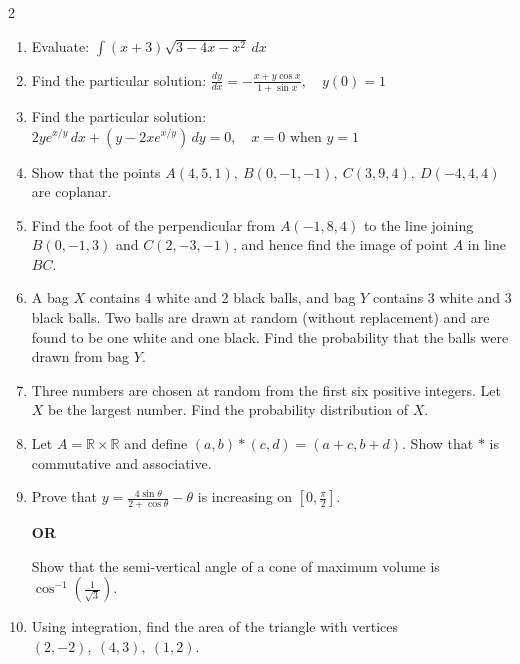 \documentclass[12pt,a4paper]{article}
\begin{document}
\begin{multicols}{2}\sloppy
\begin{enumerate}[label=\textbf{\arabic*.}, leftmargin=*, start=14]

\item Evaluate:  
$\displaystyle \int (x+3)\sqrt{3-4x-x^2}\,dx$

\item Find the particular solution:  
$\displaystyle \frac{dy}{dx}=-\frac{x+y\cos x}{1+\sin x}, \quad y(0)=1$

\item Find the particular solution:  
$\displaystyle 2y e^{x/y}\,dx+(y-2x e^{x/y})\,dy=0,\quad x=0 \text{ when } y=1$

\item Show that the points  
$A(4,5,1),\ B(0,-1,-1),\ C(3,9,4),\ D(-4,4,4)$  
are coplanar.

\item Find the foot of the perpendicular from  
$A(-1,8,4)$  
to the line joining  
$B(0,-1,3)$ and $C(2,-3,-1)$,  
and hence find the image of point $A$ in line $BC$.

\item A bag $X$ contains 4 white and 2 black balls, and bag $Y$ contains 3 white and 3 black balls.  
Two balls are drawn at random (without replacement) and are found to be one white and one black.  
Find the probability that the balls were drawn from bag $Y$.

\item Three numbers are chosen at random from the first six positive integers.  
Let $X$ be the largest number.  
Find the probability distribution of $X$.

\item Let $A=\mathbb{R}\times\mathbb{R}$ and define  
$(a,b)*(c,d)=(a+c,b+d)$.  
Show that $*$ is commutative and associative.

\item Prove that  
$\displaystyle y=\frac{4\sin\theta}{2+\cos\theta}-\theta$  
is increasing on  
$\displaystyle \left[0,\frac{\pi}{2}\right]$.

\textbf{OR}

Show that the semi-vertical angle of a cone of maximum volume is  
$\displaystyle \cos^{-1}\left(\frac{1}{\sqrt{3}}\right)$.

\item Using integration, find the area of the triangle with vertices  
$(2,-2),\ (4,3),\ (1,2)$.


\end{enumerate}
\end{multicols}
\end{document}
